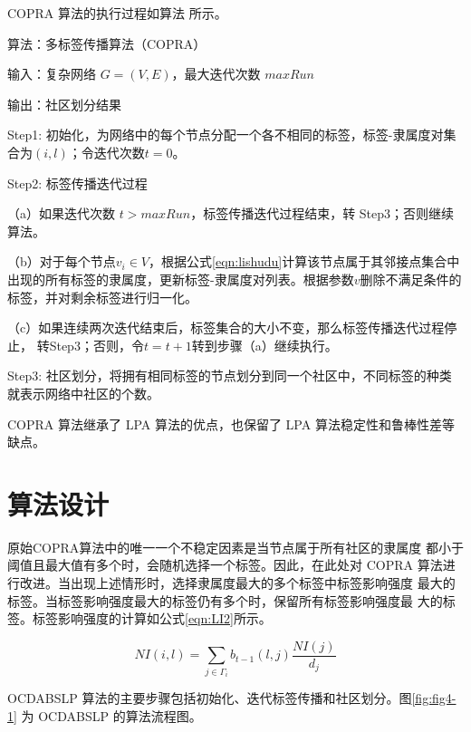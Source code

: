 COPRA 算法的执行过程如算法 所示。

算法：多标签传播算法（COPRA） 

输入：复杂网络 $G = (V, E)$，最大迭代次数 $maxRun$ 

输出：社区划分结果 

Step1:  初始化，为网络中的每个节点分配一个各不相同的标签，标签-隶属度对集合为${(i,l)}$；令迭代次数$t=0$。

Step2:  标签传播迭代过程 

（a）如果迭代次数 $t > maxRun$，标签传播迭代过程结束，转 Step3；否则继续算法。 

（b）对于每个节点$v_i\in V$，根据公式\ref{eqn:lishudu}计算该节点属于其邻接点集合中出现的所有标签的隶属度，更新标签-隶属度对列表。根据参数$v$删除不满足条件的标签，并对剩余标签进行归一化。 
 
（c）如果连续两次迭代结束后，标签集合的大小不变，那么标签传播迭代过程停止，
转Step3；否则，令$t = t+1$转到步骤（a）继续执行。 

Step3:  社区划分，将拥有相同标签的节点划分到同一个社区中，不同标签的种类就表示网络中社区的个数。

COPRA 算法继承了 LPA 算法的优点，也保留了 LPA 算法稳定性和鲁棒性差等缺点。 

\section{算法设计}
原始COPRA算法中的唯一一个不稳定因素是当节点属于所有社区的隶属度
都小于阈值且最大值有多个时，会随机选择一个标签。因此，在此处对 COPRA
算法进行改进。当出现上述情形时，选择隶属度最大的多个标签中标签影响强度
最大的标签。当标签影响强度最大的标签仍有多个时，保留所有标签影响强度最
大的标签。标签影响强度的计算如公式\ref{eqn:LI2}所示。

\begin{equation}
  \label{eqn:LI2}
  NI(i,l)=\sum_{j \in \Gamma _i} b_{t-1}(l,j) \frac{NI(j)}{d_j}
\end{equation}

OCDABSLP 算法的主要步骤包括初始化、迭代标签传播和社区划分。图\ref{fig:fig4-1}
为 OCDABSLP 的算法流程图。

